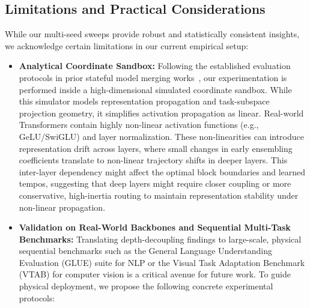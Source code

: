 \subsection{Limitations and Practical Considerations}
While our multi-seed sweeps provide robust and statistically consistent insights, we acknowledge certain limitations in our current empirical setup:
\begin{itemize}
    \item \textbf{Analytical Coordinate Sandbox:} Following the established evaluation protocols in prior stateful model merging works~\cite{chemmerge_2026, pac_kinetics_2026}, our experimentation is performed inside a high-dimensional simulated coordinate sandbox. While this simulator models representation propagation and task-subspace projection geometry, it simplifies activation propagation as linear. Real-world Transformers contain highly non-linear activation functions (e.g., GeLU/SwiGLU) and layer normalization. These non-linearities can introduce representation drift across layers, where small changes in early ensembling coefficients translate to non-linear trajectory shifts in deeper layers. This inter-layer dependency might affect the optimal block boundaries and learned tempos, suggesting that deep layers might require closer coupling or more conservative, high-inertia routing to maintain representation stability under non-linear propagation.
    \item \textbf{Validation on Real-World Backbones and Sequential Multi-Task Benchmarks:} Translating depth-decoupling findings to large-scale, physical sequential benchmarks such as the General Language Understanding Evaluation (GLUE) suite for NLP or the Visual Task Adaptation Benchmark (VTAB) for computer vision is a critical avenue for future work. To guide physical deployment, we propose the following concrete experimental protocols:
    

\end{itemize}
